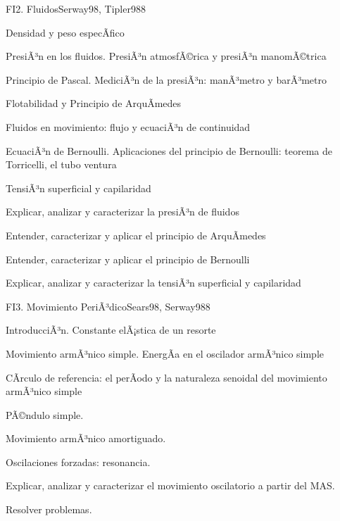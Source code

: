 \begin{syllabus}
\begin{unit}{FI2. Fluidos}{Serway98, Tipler98}{8}
\begin{topics}
         \item  Densidad y peso especÃ­fico
	 \item  PresiÃ³n en los fluidos. PresiÃ³n atmosfÃ©rica y presiÃ³n manomÃ©trica
         \item  Principio de Pascal. MediciÃ³n de la presiÃ³n: manÃ³metro y barÃ³metro
	 \item  Flotabilidad y Principio de ArquÃ­medes
         \item  Fluidos en movimiento: flujo y ecuaciÃ³n de continuidad
	 \item  EcuaciÃ³n de Bernoulli. Aplicaciones del principio de Bernoulli: teorema de Torricelli, el tubo ventura
         \item  TensiÃ³n superficial y capilaridad
   \end{topics}

   \begin{unitgoals}
         \item  Explicar, analizar y caracterizar la presiÃ³n de fluidos
         \item  Entender, caracterizar y aplicar el principio de ArquÃ­medes
         \item  Entender, caracterizar y aplicar el principio de Bernoulli
         \item  Explicar, analizar y caracterizar la tensiÃ³n superficial y capilaridad
   \end{unitgoals}
\end{unit}

\begin{unit}{FI3. Movimiento PeriÃ³dico}{Sears98, Serway98}{8}
\begin{topics}
         \item  IntroducciÃ³n. Constante elÃ¡stica de un resorte
	 \item  Movimiento armÃ³nico simple. EnergÃ­a en el oscilador armÃ³nico simple
         \item  CÃ­rculo de referencia: el perÃ­odo y la naturaleza senoidal del movimiento armÃ³nico simple
	 \item  PÃ©ndulo simple.
         \item  Movimiento armÃ³nico amortiguado.
         \item  Oscilaciones forzadas: resonancia.
   \end{topics}

   \begin{unitgoals}
         \item  Explicar, analizar y caracterizar el movimiento oscilatorio a partir del MAS.
         \item  Resolver problemas.
   \end{unitgoals}
\end{unit}


\end{syllabus}
